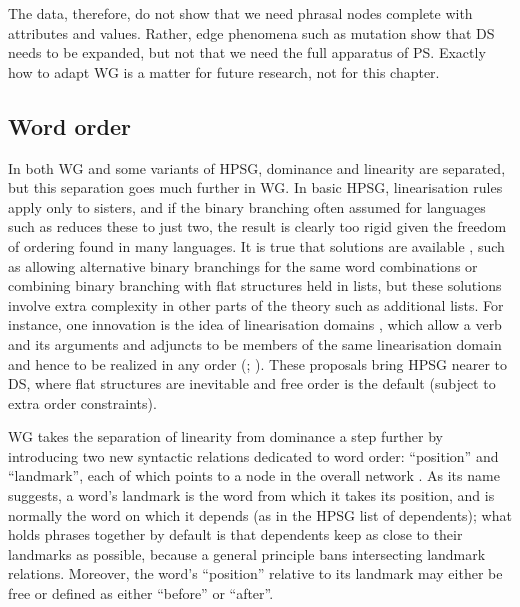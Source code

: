 \documentclass[output=paper
 	        ,biblatex
                ,babelshorthands
                ,newtxmath
                ,draftmode
                ,colorlinks, citecolor=brown
]{langscibook}
\begin{document}
The  data, therefore, do not show that we need phrasal nodes complete with attributes and
values. Rather, edge phenomena such as  mutation show that DS needs to be expanded, but
not that we need the full apparatus of PS. Exactly how to adapt WG is a matter for future research,
not for this chapter.


\subsection{Word order}
\label{sec:4.4}

In both WG and some variants of HPSG, dominance and linearity are separated, but this separation
goes much further in WG. In basic HPSG, linearisation rules apply only to sisters, and if the binary
branching often assumed for languages such as  \citep[Section~10.3]{MuellerGT-Eng2}
reduces these to just two, the result is clearly too rigid given the freedom of ordering found in
many languages. It is true that solutions are available \citep[Chapter~10]{MuellerGT-Eng2}, such as
allowing alternative binary branchings for the same word combinations  or combining binary branching
with flat structures held in lists, but these solutions involve extra complexity in other parts of
the theory such as additional lists. For instance, one innovation is the idea of linearisation
domains \citep{Reape94a,Kathol2000a,Babel}, which allow a verb and its arguments and adjuncts to be
members of the same linearisation domain and hence to be realized in any order
(\citealt[302]{MuellerGT-Eng2}; ). These
proposals bring HPSG nearer to DS, where flat structures are inevitable and free order is the
default (subject to extra order constraints).

WG takes the separation of linearity from dominance a step further by introducing two new syntactic
relations dedicated to word order: ``position'' and ``landmark'', each of which points to a node in
the overall network \citep{Hudson2018a}. As its name suggests, a word's landmark is the word from
which it takes its position, and is normally the word on which it depends (as in the HPSG list of
dependents); what holds phrases together by default is that dependents keep as close to their
landmarks as possible, because a general principle bans intersecting landmark relations. Moreover,
the word's ``position'' relative to its landmark may either be free or defined as either ``before''
or ``after''.
\end{document}
